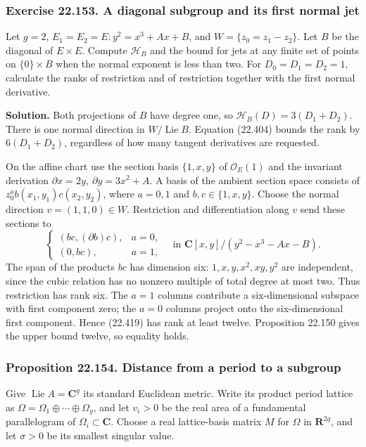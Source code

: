 \documentclass[
  11pt,
  a4paper,
]{article}
\begin{document}
\subsubsection{Exercise 22.153. A diagonal subgroup and its first normal
jet}\label{exercise-22.153.-a-diagonal-subgroup-and-its-first-normal-jet}

Let \(g=2\), \(E_1=E_2=E:y^2=x^3+Ax+B\), and \(W=\{z_0=z_1-z_2\}\). Let
\(B\) be the diagonal of \(E\times E\). Compute \(\mathcal H_B\) and the
bound for jets at any finite set of points on \(\{0\}\times B\) when the
normal exponent is less than two. For \(D_0=D_1=D_2=1\), calculate the
ranks of restriction and of restriction together with the first normal
derivative.

\textbf{Solution.} Both projections of \(B\) have degree one, so
\(\mathcal H_B(D)=3(D_1+D_2)\). There is one normal direction in
\(W/\operatorname{Lie}B\). Equation (22.404) bounds the rank by
\(6(D_1+D_2)\), regardless of how many tangent derivatives are
requested.

On the affine chart use the section basis \(\{1,x,y\}\) of
\(\mathcal O_E(1)\) and the invariant derivation
\(\partial x=2y,\ \partial y=3x^2+A\). A basis of the ambient section
space consists of \(z_0^a b(x_1,y_1)c(x_2,y_2)\), where \(a=0,1\) and
\(b,c\in\{1,x,y\}\). Choose the normal direction \(v=(1,1,0)\in W\).
Restriction and differentiation along \(v\) send these sections to \[
 \begin{cases}
 (bc,(\partial b)c),&a=0,\\
 (0,bc),&a=1,
 \end{cases}
 \quad\text{in }\mathbf C[x,y]/(y^2-x^3-Ax-B).
 \tag{22.419}
\] The span of the products \(bc\) has dimension six:
\(1,x,y,x^2,xy,y^2\) are independent, since the cubic relation has no
nonzero multiple of total degree at most two. Thus restriction has rank
six. The \(a=1\) columns contribute a six-dimensional subspace with
first component zero; the \(a=0\) columns project onto the
six-dimensional first component. Hence (22.419) has rank at least
twelve. Proposition 22.150 gives the upper bound twelve, so equality
holds.

\subsubsection{Proposition 22.154. Distance from a period to a
subgroup}\label{proposition-22.154.-distance-from-a-period-to-a-subgroup}

Give \(\operatorname{Lie}A=\mathbf C^g\) its standard Euclidean metric.
Write its product period lattice as
\(\Omega=\Omega_1\oplus\cdots\oplus\Omega_g\), and let \(v_i>0\) be the
real area of a fundamental parallelogram of
\(\Omega_i\subset\mathbf C\). Choose a real lattice-basis matrix \(M\)
for \(\Omega\) in \(\mathbf R^{2g}\), and let \(\sigma>0\) be its
smallest singular value.
\end{document}
